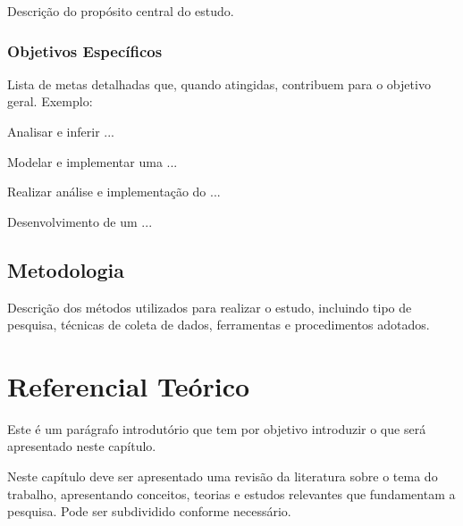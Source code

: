 Descrição do propósito central do estudo.


\subsection{Objetivos Específicos} \label{sec:objetivos-especificos}
Lista de metas detalhadas que, quando atingidas, contribuem para o objetivo geral.
Exemplo:
\begin{alineas} %
    \item Analisar e inferir ...
    
    \item Modelar e implementar uma ...
    
    \item Realizar análise e implementação do ...
    
    \item Desenvolvimento de um ...
\end{alineas}


\section{Metodologia} \label{sec:metodologia}
Descrição dos métodos utilizados para realizar o estudo, incluindo tipo de pesquisa, técnicas de coleta de dados, ferramentas e procedimentos adotados.
	

\chapter{Referencial Teórico} \label{ch:referencia-teorico}

Este é um parágrafo introdutório que tem por objetivo introduzir o que será apresentado neste capítulo.

Neste capítulo deve ser apresentado uma revisão da literatura sobre o tema do trabalho, apresentando conceitos, teorias e estudos relevantes que fundamentam a pesquisa. Pode ser subdividido conforme necessário. 


